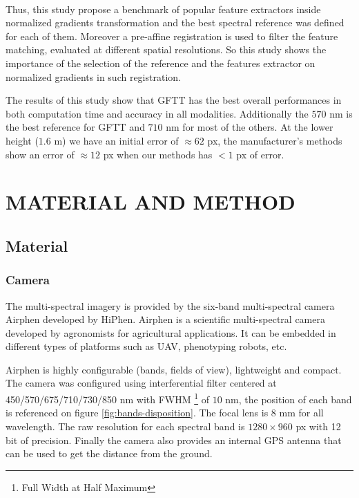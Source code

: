 \documentclass[a4paper,twoside]{article}
\begin{document}
	\\
	\par Thus, this study propose a benchmark of popular feature extractors inside normalized gradients transformation
	and the best spectral reference was defined for each of them.
	Moreover a pre-affine registration is used to filter the feature matching, evaluated at different spatial resolutions.
	So this study shows the importance of the selection of the reference and the features extractor on normalized gradients in such registration.
	\\
	\par The results of this study show that GFTT has the best overall performances in both computation time and accuracy in all modalities.
	Additionally the $570$ nm is the best reference for GFTT and $710$ nm for most of the others.
	At the lower height ($1.6$ m) we have an initial error of $\approx 62$ px,
	the manufacturer's methods show an error of $\approx 12$ px when our methods has $<1$ px of error.
	
	\section{\uppercase{Material and Method}}
	
	\subsection{Material}
	\subsubsection{Camera}
	
	The multi-spectral imagery is provided by the six-band multi-spectral camera Airphen developed by HiPhen.
	Airphen is a scientific multi-spectral camera developed by agronomists for agricultural applications.
	It can be embedded in different types of platforms such as UAV, phenotyping robots, etc.
	\\
	\par Airphen is highly configurable (bands, fields of view), lightweight and compact.
	The camera was configured using interferential filter centered at 450/570/675/710/730/850 nm
	with FWHM \footnote{Full Width at Half Maximum} of $10$ nm, the position of each band is referenced on figure \ref{fig:bands-disposition}.
	The focal lens is 8 mm for all wavelength. The raw resolution for each spectral band is $1280 \times 960$ px with 12 bit of precision.
	Finally the camera also provides an internal GPS antenna that can be used to get the distance from the ground.
	
\end{document}
